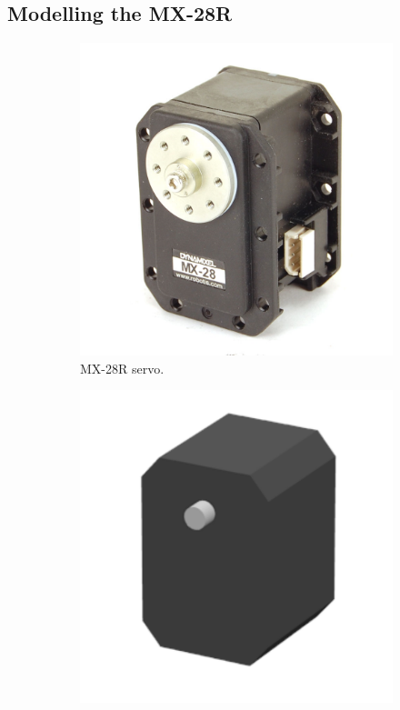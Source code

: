 \subsection{Modelling the MX-28R}
\begin{figure}[htp]
\center
\begin{subfigure}[b]{0.3\textwidth}
    \includegraphics[width = \textwidth]{figures/mx28}
    \caption{MX-28R servo.}
    \label{fig:mx28_real}
\end{subfigure}
\hfill
\begin{subfigure}[b]{0.3\textwidth}
    \includegraphics[width = \textwidth]{figures/mx28_model}

\end{subfigure}
\end{figure}
